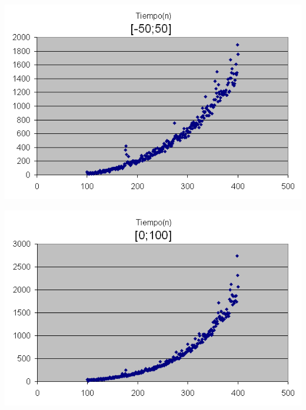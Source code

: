 \begin{center}
	\includegraphics[scale=0.6]{images/ej1_2.png}
\end{center}

\begin{center}
	\includegraphics[scale=0.6]{images/ej1_3.png}
\end{center}

%
